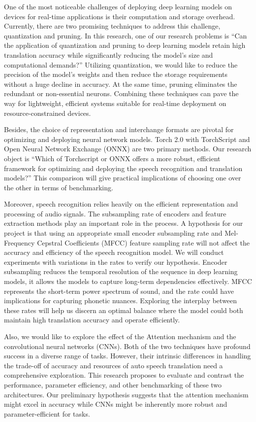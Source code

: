 \documentclass[11pt]{article}
\begin{document}
One of the most noticeable challenges of deploying deep learning models on devices for real-time applications is their computation and storage overhead. Currently, there are two promising techniques to address this challenge, quantization and pruning. In this research, one of our research problems is “Can the application of quantization and pruning to deep learning models retain high translation accuracy while significantly reducing the model's size and computational demands?” Utilizing quantization, we would like to reduce the precision of the model’s weights and then reduce the storage requirements without a huge decline in accuracy. At the same time, pruning eliminates the redundant or non-essential neurons. Combining these techniques can pave the way for lightweight, efficient systems suitable for real-time deployment on resource-constrained devices.

Besides, the choice of representation and interchange formats are pivotal for optimizing and deploying neural network models. Torch 2.0 with TorchScript and Open Neural Network Exchange (ONNX) are two primary methods. Our research object is “Which of Torchscript or ONNX offers a more robust, efficient framework for optimizing and deploying the speech recognition and translation models?” This comparison will give practical implications of choosing one over the other in terms of benchmarking.

Moreover, speech recognition relies heavily on the efficient representation and processing of audio signals. The subsampling rate of encoders and feature extraction methods play an important role in the process. A hypothesis for our project is that using an appropriate small encoder subsampling rate and Mel-Frequency Cepstral Coefficients (MFCC) feature sampling rate will not affect the accuracy and efficiency of the speech recognition model. We will conduct experiments with variations in the rates to verify our hypothesis. Encoder subsampling reduces the temporal resolution of the sequence in deep learning models, it allows the models to capture long-term dependencies effectively. MFCC represents the short-term power spectrum of sound, and the rate could have implications for capturing phonetic nuances. Exploring the interplay between these rates will help us discern an optimal balance where the model could both maintain high translation accuracy and operate efficiently.

Also, we would like to explore the effect of the Attention mechanism and the convolutional neural networks (CNNs). Both of the two techniques have profound success in a diverse range of tasks. However, their intrinsic differences in handling the trade-off of accuracy and resources of auto speech translation need a comprehensive exploration. This research proposes to evaluate and contrast the performance, parameter efficiency, and other benchmarking of these two architectures. Our preliminary hypothesis suggests that the attention mechanism might excel in accuracy while CNNs might be inherently more robust and parameter-efficient for tasks.
\end{document}
